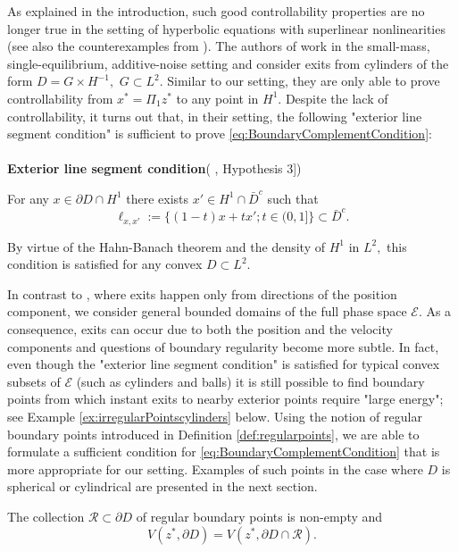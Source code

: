 \documentclass[10pt, reqno]{amsart}
\newcommand{\e}{\mathcal{E}}
\newenvironment{customthm}[1]
{\renewcommand\theinnercustomthm{#1}\innercustomthm}
{\endinnercustomthm}
\theoremstyle{definition}
\numberwithin{lem}{section}
\numberwithin{cor}{section}
\numberwithin{prop}{section}
\numberwithin{thm}{section}
\numberwithin{dfn}{section}
\begin{document}
      As explained in the introduction, %
      such good controllability properties are no longer true in the setting of hyperbolic equations with superlinear nonlinearities (see also the counterexamples from \cite[Theorem 2]{Zuazua1993}). The authors of \cite{cerrai2016smoluchowski} work in the small-mass, single-equilibrium,  additive-noise setting and consider exits from cylinders of the form $D=G\times H^{-1},$ $G\subset L^2.$ Similar to our setting, they are only able to prove controllability from $x^*=\Pi_1z^*$ to any point in $H^1.$ Despite the lack of controllability, it turns out that, in their setting,  the following "exterior line segment condition" is sufficient to prove \eqref{eq:BoundaryComplementCondition}:
      \\ \\
      \noindent \textbf{Exterior line segment condition}( \cite{cerrai2016smoluchowski}, Hypothesis 3])   
     
      For any $x\in\partial D\cap H^1$ there exists $x'\in H^1\cap\bar{D}^c$ such that 
      $$\ell_{x,x'}:=\big\{ (1-t)x+tx'; t\in(0,1]    \big\}\subset\bar{D}^c.$$
   
    By virtue of the Hahn-Banach theorem and the density of $H^1$ in $L^2,$ this condition is satisfied for any convex $D\subset L^2.$




     
    
      
       In contrast to \cite{cerrai2016smoluchowski}, where exits happen only from directions of the position component, we consider general bounded domains of the full phase space $\e.$ As a consequence, exits can occur due to both the position and the velocity components and questions of boundary regularity become more subtle. In fact, even though the "exterior line segment condition" is satisfied for typical convex subsets of $\e$ (such as cylinders and balls) it is still possible to find boundary points from which instant exits to nearby exterior points require "large energy"; see Example \ref{ex:irregularPointscylinders} below.  Using the notion of regular boundary points introduced in Definition \ref{def:regularpoints}, we are able to formulate a sufficient condition for \eqref{eq:BoundaryComplementCondition} that is more appropriate for our setting. Examples of such points in the case where $D$ is spherical or cylindrical are presented in the next section.



       \begin{customthm}{6}\label{Assumption:MinimizingRegularPoints} 
           The collection $\mathcal{R}\subset\partial D$ of regular boundary points is non-empty and $$V(z^*,\partial D)= V(z^*,\partial D\cap \mathcal{R}).         $$
     \end{customthm}
\end{document}
